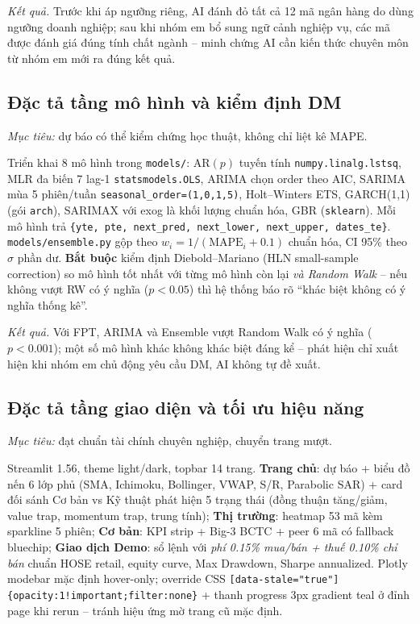 \documentclass[12pt,a4paper]{article}
\begin{document}
\textit{Kết quả.} Trước khi áp ngưỡng riêng, AI đánh đỏ tất cả 12 mã ngân hàng do dùng ngưỡng doanh nghiệp; sau khi nhóm em bổ sung ngữ cảnh nghiệp vụ, các mã được đánh giá đúng tính chất ngành -- minh chứng AI cần kiến thức chuyên môn từ nhóm em mới ra đúng kết quả.

\subsection{Đặc tả tầng mô hình và kiểm định DM}

\textit{Mục tiêu:} dự báo có thể kiểm chứng học thuật, không chỉ liệt kê MAPE.

\begin{promptbox}
\footnotesize Triển khai 8 mô hình trong \texttt{models/}: AR$(p)$ tuyến tính \texttt{numpy.linalg.lstsq}, MLR đa biến 7 lag-1 \texttt{statsmodels.OLS}, ARIMA chọn order theo AIC, SARIMA mùa 5 phiên/tuần \texttt{seasonal\_order=(1,0,1,5)}, Holt--Winters ETS, GARCH(1,1) (gói \texttt{arch}), SARIMAX với exog là khối lượng chuẩn hóa, GBR (\texttt{sklearn}). Mỗi mô hình trả \texttt{\{yte, pte, next\_pred, next\_lower, next\_upper, dates\_te\}}. \texttt{models/ensemble.py} gộp theo $w_i = 1/(\text{MAPE}_i + 0.1)$ chuẩn hóa, CI 95\% theo $\sigma$ phần dư. \textbf{Bắt buộc} kiểm định Diebold--Mariano (HLN small-sample correction) so mô hình tốt nhất với từng mô hình còn lại \emph{và Random Walk} -- nếu không vượt RW có ý nghĩa ($p<0.05$) thì hệ thống báo rõ ``khác biệt không có ý nghĩa thống kê''.
\end{promptbox}

\textit{Kết quả.} Với FPT, ARIMA và Ensemble vượt Random Walk có ý nghĩa ($p<0.001$); một số mô hình khác không khác biệt đáng kể -- phát hiện chỉ xuất hiện khi nhóm em chủ động yêu cầu DM, AI không tự đề xuất.

\subsection{Đặc tả tầng giao diện và tối ưu hiệu năng}

\textit{Mục tiêu:} đạt chuẩn tài chính chuyên nghiệp, chuyển trang mượt.

\begin{promptbox}
\footnotesize Streamlit 1.56, theme light/dark, topbar 14 trang. \textbf{Trang chủ}: dự báo + biểu đồ nến 6 lớp phủ (SMA, Ichimoku, Bollinger, VWAP, S/R, Parabolic SAR) + card đối sánh Cơ bản vs Kỹ thuật phát hiện 5 trạng thái (đồng thuận tăng/giảm, value trap, momentum trap, trung tính); \textbf{Thị trường}: heatmap 53 mã kèm sparkline 5 phiên; \textbf{Cơ bản}: KPI strip + Big-3 BCTC + peer 6 mã có fallback bluechip; \textbf{Giao dịch Demo}: sổ lệnh với \emph{phí 0.15\% mua/bán + thuế 0.10\% chỉ bán} chuẩn HOSE retail, equity curve, Max Drawdown, Sharpe annualized. Plotly modebar mặc định hover-only; override CSS \texttt{[data-stale="true"]\{opacity:1!important;filter:none\}} + thanh progress 3px gradient teal ở đỉnh page khi rerun -- tránh hiệu ứng mờ trang cũ mặc định.
\end{promptbox}
\end{document}
